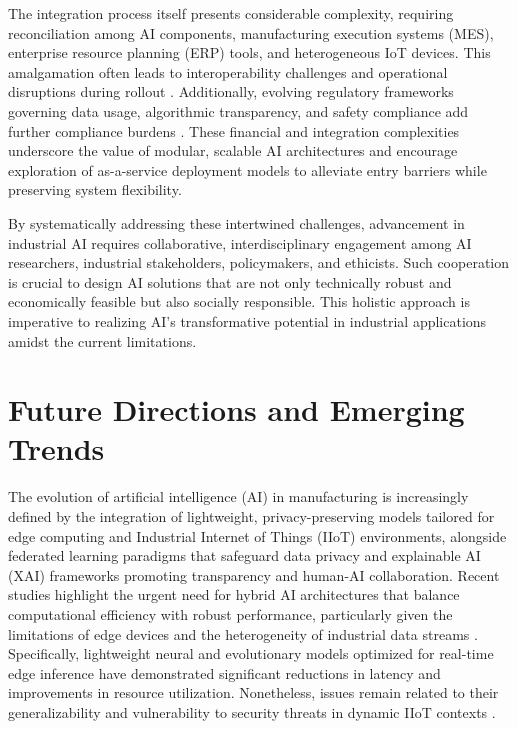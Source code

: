 \documentclass[sigconf]{acmart}
\begin{document}
The integration process itself presents considerable complexity, requiring reconciliation among AI components, manufacturing execution systems (MES), enterprise resource planning (ERP) tools, and heterogeneous IoT devices. This amalgamation often leads to interoperability challenges and operational disruptions during rollout \cite{ref6,ref44}. Additionally, evolving regulatory frameworks governing data usage, algorithmic transparency, and safety compliance add further compliance burdens \cite{ref2,ref13}. These financial and integration complexities underscore the value of modular, scalable AI architectures and encourage exploration of as-a-service deployment models to alleviate entry barriers while preserving system flexibility.

\vspace{1em}
By systematically addressing these intertwined challenges, advancement in industrial AI requires collaborative, interdisciplinary engagement among AI researchers, industrial stakeholders, policymakers, and ethicists. Such cooperation is crucial to design AI solutions that are not only technically robust and economically feasible but also socially responsible. This holistic approach is imperative to realizing AI’s transformative potential in industrial applications amidst the current limitations.

\section{Future Directions and Emerging Trends}

The evolution of artificial intelligence (AI) in manufacturing is increasingly defined by the integration of lightweight, privacy-preserving models tailored for edge computing and Industrial Internet of Things (IIoT) environments, alongside federated learning paradigms that safeguard data privacy and explainable AI (XAI) frameworks promoting transparency and human-AI collaboration. Recent studies highlight the urgent need for hybrid AI architectures that balance computational efficiency with robust performance, particularly given the limitations of edge devices and the heterogeneity of industrial data streams \cite{ref5,ref30}. Specifically, lightweight neural and evolutionary models optimized for real-time edge inference have demonstrated significant reductions in latency and improvements in resource utilization. Nonetheless, issues remain related to their generalizability and vulnerability to security threats in dynamic IIoT contexts \cite{ref31}.
\end{document}
